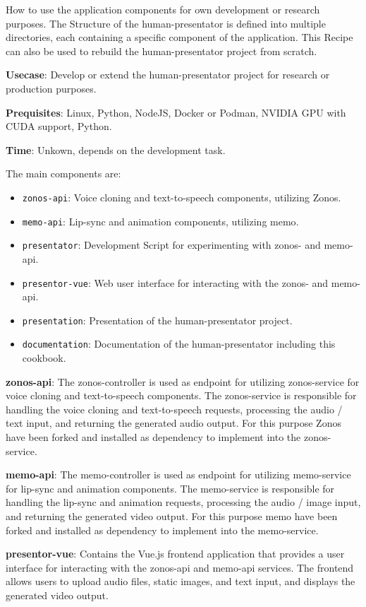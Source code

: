 How to use the application components for own development or research purposes. The Structure of the
human-presentator is defined into multiple directories, each containing a specific component of the
application. This Recipe can also be used to rebuild the human-presentator project from scratch.

\textbf{Usecase}: Develop or extend the human-presentator project for research or production purposes.

\textbf{Prequisites}: Linux, Python, NodeJS, Docker or Podman, NVIDIA GPU with CUDA support, Python.

\textbf{Time}: Unkown, depends on the development task.

The main components are:
\begin{itemize}
  \item \texttt{zonos-api}: Voice cloning and text-to-speech components, utilizing \gls{Zonos}.
  \item \texttt{memo-api}: Lip-sync and animation components, utilizing \gls{memo}.
  \item \texttt{presentator}: Development Script for experimenting with zonos- and memo-api.
  \item \texttt{presentor-vue}: Web user interface for interacting with the zonos- and memo-api.
  \item \texttt{presentation}: Presentation of the human-presentator project.
  \item \texttt{documentation}: Documentation of the human-presentator including this cookbook.
\end{itemize}

\textbf{zonos-api}: The zonos-controller is used as endpoint for utilizing zonos-service for voice
cloning and text-to-speech components. The zonos-service is responsible for handling the voice
cloning and text-to-speech requests, processing the audio / text input, and returning the generated
audio output. For this purpose \gls{Zonos} have been forked and installed as dependency to implement
into the zonos-service.

\textbf{memo-api}: The memo-controller is used as endpoint for utilizing memo-service for lip-sync
and animation components. The memo-service is responsible for handling the lip-sync and animation
requests, processing the audio / image input, and returning the generated video output. For this
purpose \gls{memo} have been forked and installed as dependency to implement into the memo-service.

\textbf{presentor-vue}: Contains the Vue.js frontend application that provides a user interface for
interacting with the zonos-api and memo-api services. The frontend allows users to upload audio
files, static images, and text input, and displays the generated video output.
